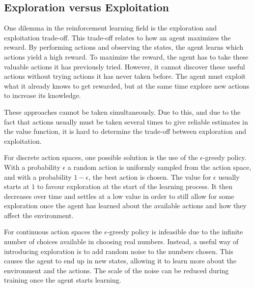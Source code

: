 \documentclass{kththesis}
\begin{document}
\subsection{Exploration versus Exploitation}
\label{subsec:explorevsexploit}
One dilemma in the reinforcement learning field is the exploration and exploitation trade-off. This trade-off relates to how an agent maximizes the reward. By performing actions and observing the states, the agent learns which actions yield a high reward. To maximize the reward, the agent has to take these valuable actions it has previously tried. However, it cannot discover these useful actions without trying actions it has never taken before. The agent must exploit what it already knows to get rewarded, but at the same time explore new actions to increase its knowledge.

These approaches cannot be taken simultaneously. Due to this, and due to the fact that actions usually must be taken several times to give reliable estimates in the value function, it is hard to determine the trade-off between exploration and exploitation.

For discrete action spaces, one possible solution is the use of the $\epsilon$-greedy policy. With a probability $\epsilon$ a random action is uniformly sampled from the action space, and with a probability $1 - \epsilon$, the best action is chosen. The value for $\epsilon$ usually starts at $1$ to favour exploration at the start of the learning process. It then decreases over time and settles at a low value in order to still allow for some exploration once the agent has learned about the available actions and how they affect the environment. \parencite{sutton1998introduction}

For continuous action spaces the $\epsilon$-greedy policy is infeasible due to the infinite number of choices available in choosing real numbers. Instead, a useful way of introducing exploration is to add random noise to the numbers chosen. This causes the agent to end up in new states, allowing it to learn more about the environment and the actions. The scale of the noise can be reduced during training once the agent starts learning. \parencite{lillicrap2015continuous}
\end{document}
